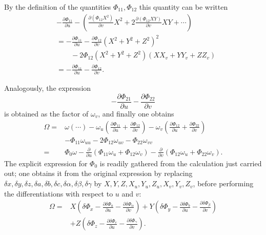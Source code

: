 \documentclass[11pt,a4paper,leqno]{article}
\begin{document}
By the definition of the quantities $\Phi_{11},\Phi_{12}$ this quantity can
be written
\[
\begin{aligned}
&-\frac{\partial\Phi_{11}}{\partial u}
-\left(\frac{\partial(\Phi_{12}X^2)}{\partial v}X^2
+2\frac{\partial(\Phi_{12}XY)}{\partial v}XY+\cdots\right)\\
&=-\frac{\partial\Phi_{11}}{\partial u}
-\frac{\partial\Phi_{12}}{\partial v}(X^2+Y^2+Z^2)^2\\
&\qquad-2\Phi_{12}(X^2+Y^2+Z^2)(XX_v+YY_v+ZZ_v)\\
&=-\frac{\partial\Phi_{11}}{\partial u}
-\frac{\partial\Phi_{12}}{\partial v}.
\end{aligned}
\]

Analogously, the expression
\[
-\frac{\partial\Phi_{21}}{\partial u}
-\frac{\partial\Phi_{22}}{\partial v}
\]
is obtained as the factor of $\omega_v$, and finally one obtains
\begin{equation}\tag{29}
\begin{aligned}
\Omega={}&\omega(\cdots)
-\omega_u\left(\frac{\partial\Phi_{11}}{\partial u}
+\frac{\partial\Phi_{12}}{\partial v}\right)
-\omega_v\left(\frac{\partial\Phi_{12}}{\partial u}
+\frac{\partial\Phi_{22}}{\partial v}\right)\\
&-\Phi_{11}\omega_{uu}-2\Phi_{12}\omega_{uv}-\Phi_{22}\omega_{vv}\\
={}&\Phi_0\omega
-\frac{\partial}{\partial u}(\Phi_{11}\omega_u+\Phi_{12}\omega_v)
-\frac{\partial}{\partial v}(\Phi_{12}\omega_u+\Phi_{22}\omega_v).
\end{aligned}
\end{equation}
The explicit expression for $\Phi_0$ is readily gathered from the
calculation just carried out; one obtains it from the original expression
by replacing $\delta x,\delta y,\delta z,\delta a,\delta b,\delta c,
\delta\alpha,\delta\beta,\delta\gamma$ by
$X,Y,Z,X_u,Y_u,Z_u,X_v,Y_v,Z_v$, before performing the differentiations
with respect to $u$ and $v$:
\[
\begin{aligned}
\Omega={}&X\left(\delta\Phi_x
-\frac{\partial\delta\Phi_a}{\partial u}
-\frac{\partial\delta\Phi_\alpha}{\partial v}\right)
+Y\left(\delta\Phi_y
-\frac{\partial\delta\Phi_b}{\partial u}
-\frac{\partial\delta\Phi_\beta}{\partial v}\right)\\
&+Z\left(\delta\Phi_z
-\frac{\partial\delta\Phi_c}{\partial u}
-\frac{\partial\delta\Phi_\gamma}{\partial v}\right).
\end{aligned}
\]
\end{document}
